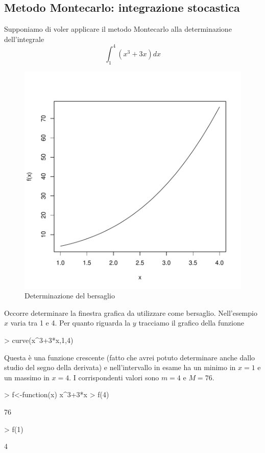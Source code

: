 \documentclass[onecolumn,11pt]{book}
\begin{document}
\subsection{Metodo Montecarlo: integrazione stocastica}
Supponiamo di voler applicare il metodo Montecarlo alla determinazione dell'integrale
\begin{equation*}
\int_1^4{ (x^3+3x)dx}
\end{equation*}
\begin{figure}[htbp]
\begin{center}
\includegraphics{RbookParte1-155}
\caption{Determinazione del bersaglio}
\label{fig:dgefault}
\end{center}
\end{figure}

Occorre determinare la finestra grafica da utilizzare come bersaglio.
Nell'esempio $x$ varia tra 1 e 4.
Per quanto riguarda la  $y$  tracciamo il grafico della funzione

\begin{Schunk}
\begin{Sinput}
> curve(x^3+3*x,1,4)
\end{Sinput}
\end{Schunk}
Questa \`e una funzione crescente (fatto che avrei potuto determinare anche dallo studio del segno della derivata) e nell'intervallo in esame ha un minimo  in $x=1$ e un massimo in $x=4$. I corrispondenti valori sono $m=4$ e $M=76$.
\begin{Schunk}
\begin{Sinput}
> f<-function(x) x^3+3*x
> f(4)
\end{Sinput}
\begin{Soutput}
[1] 76
\end{Soutput}
\begin{Sinput}
> f(1)
\end{Sinput}
\begin{Soutput}
[1] 4
\end{Soutput}
\end{Schunk}
\end{document}
